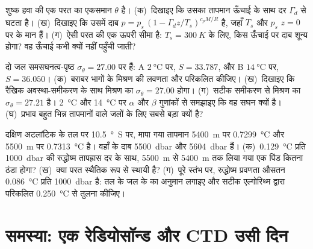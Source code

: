 \begin{exercise}[$\star\star\star$]\label{exo:b1:fluid-envelopes-structure:10}
शुष्क हवा की एक परत का एकसमान  $\theta$ है। (क)~दिखाइए कि उसका तापमान ऊँचाई के साथ दर $\Gamma_d$ से घटता है। (ख)~दिखाइए कि उसमें दाब $p = p_s\,(1 - \Gamma_d z/T_s)^{c_pM/R}$ है, जहाँ $T_s$ और $p_s$ $z = 0$ पर के मान हैं। (ग)~ऐसी परत की एक ऊपरी सीमा है: $T_s = \qty{300}{K}$ के लिए, किस ऊँचाई पर दाब शून्य होगा? वह ऊँचाई कभी क्यों नहीं पहुँची जाती?
\end{exercise}

\begin{exercise}[$\star\star\star$]\label{exo:b1:fluid-envelopes-structure:11}
दो जल समसघनत्व-पृष्ठ $\sigma_\theta = 27.00$ पर हैं: A $\qty{2}{\celsius}$ पर, $S = 33.787$, और B $\qty{14}{\celsius}$ पर, $S = 36.050$। (क)~बराबर भागों के मिश्रण की लवणता और  परिकलित कीजिए। (ख)~दिखाइए कि रैखिक अवस्था-समीकरण के साथ मिश्रण का $\sigma_\theta = 27.00$ होगा। (ग)~सटीक समीकरण से मिश्रण का $\sigma_\theta = 27.21$ है। \qty{2}{\celsius} और \qty{14}{\celsius} पर $\alpha$ और $\beta$ गुणांकों से समझाइए कि वह सघन क्यों है। (घ)~प्रभाव बहुत भिन्न तापमानों वाले जलों के लिए सबसे बड़ा क्यों है?
\end{exercise}

\begin{exercise}[$\star\star\star$]\label{exo:b1:fluid-envelopes-structure:12}
दक्षिण अटलांटिक के तल पर \qty{10.5}{\degree S} पर, मापा गया तापमान \qty{5400}{m} पर \qty{0.7299}{\celsius} और \qty{5500}{m} पर \qty{0.7313}{\celsius} है। वहाँ के दाब \qty{5500}{dbar} और \qty{5604}{dbar} हैं। (क)~\qty{0.129}{\celsius} प्रति \qty{1000}{dbar} की रुद्धोष्म तापह्रास दर के साथ, \qty{5500}{m} से \qty{5400}{m} तक लिया गया एक पिंड कितना ठंडा होगा? (ख)~क्या परत स्थैतिक रूप से स्थायी है? (ग)~पूरे स्तंभ पर, रुद्धोष्म प्रवणता औसतन \qty{0.086}{\celsius} प्रति \qty{1000}{dbar} है: तल के जल के  का अनुमान लगाइए और सटीक एल्गोरिथ्म द्वारा परिकलित \qty{0.250}{\celsius} से तुलना कीजिए।
\end{exercise}

\section{समस्या: एक रेडियोसॉन्ड और CTD उसी दिन}

